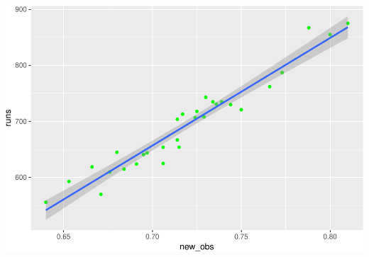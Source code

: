 \documentclass[]{article}
\begin{document}
\includegraphics{DATA_606_Lab_7_files/figure-latex/unnamed-chunk-4-2.pdf}
\end{document}
